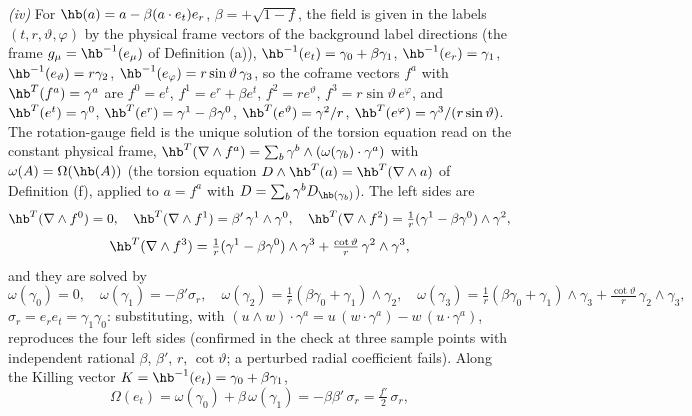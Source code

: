 \emph{(iv)} For $\hb(a) = a - \beta(a\cdot e_{t})e_{r}$, $\beta = +\sqrt{1 - f}$, the field is given in the labels $(t, r, \vartheta, \varphi)$ by the physical frame vectors of the background label directions (the frame $g_{\mu} = \hb^{-1}(e_{\mu})$ of Definition (a)), $\hb^{-1}(e_{t}) = \gamma_{0} + \beta\gamma_{1}$, $\hb^{-1}(e_{r}) = \gamma_{1}$, $\hb^{-1}(e_{\vartheta}) = r\gamma_{2}$, $\hb^{-1}(e_{\varphi}) = r\sin\vartheta\,\gamma_{3}$, so the coframe vectors $f^{a}$ with $\hb^{T}(f^{a}) = \gamma^{a}$ are $f^{0} = e^{t}$, $f^{1} = e^{r} + \beta e^{t}$, $f^{2} = r e^{\vartheta}$, $f^{3} = r\sin\vartheta\,e^{\varphi}$, and $\hb^{T}(e^{t}) = \gamma^{0}$, $\hb^{T}(e^{r}) = \gamma^{1} - \beta\gamma^{0}$, $\hb^{T}(e^{\vartheta}) = \gamma^{2}/r$, $\hb^{T}(e^{\varphi}) = \gamma^{3}/(r\sin\vartheta)$. The rotation-gauge field is the unique solution of the torsion equation read on the constant physical frame, $\hb^{T}(\nabla \wedge f^{a}) = \sum_{b}\gamma^{b} \wedge (\omega(\gamma_{b}) \cdot \gamma^{a})$ with $\omega(A) = \Omega(\hb(A))$ (the torsion equation $D \wedge \hb^{T}(a) = \hb^{T}(\nabla \wedge a)$ of Definition (f), applied to $a = f^{a}$ with $D = \sum_{b}\gamma^{b}D_{\hb(\gamma_{b})}$). The left sides are
\[
\hb^{T}(\nabla \wedge f^{0}) = 0, \quad \hb^{T}(\nabla \wedge f^{1}) = \beta'\,\gamma^{1} \wedge \gamma^{0}, \quad \hb^{T}(\nabla \wedge f^{2}) = \tfrac{1}{r}(\gamma^{1} - \beta\gamma^{0}) \wedge \gamma^{2},
\]
\[
\hb^{T}(\nabla \wedge f^{3}) = \tfrac{1}{r}(\gamma^{1} - \beta\gamma^{0}) \wedge \gamma^{3} + \tfrac{\cot\vartheta}{r}\,\gamma^{2} \wedge \gamma^{3},
\]
and they are solved by
\[
\omega(\gamma_{0}) = 0, \quad \omega(\gamma_{1}) = -\beta'\sigma_{r}, \quad \omega(\gamma_{2}) = \tfrac{1}{r}(\beta\gamma_{0} + \gamma_{1}) \wedge \gamma_{2}, \quad \omega(\gamma_{3}) = \tfrac{1}{r}(\beta\gamma_{0} + \gamma_{1}) \wedge \gamma_{3} + \tfrac{\cot\vartheta}{r}\,\gamma_{2} \wedge \gamma_{3},
\]
$\sigma_{r} = e_{r}e_{t} = \gamma_{1}\gamma_{0}$: substituting, with $(u \wedge w) \cdot \gamma^{a} = u\,(w \cdot \gamma^{a}) - w\,(u \cdot \gamma^{a})$, reproduces the four left sides (confirmed in the check at three sample points with independent rational $\beta$, $\beta'$, $r$, $\cot\vartheta$; a perturbed radial coefficient fails). Along the Killing vector $K = \hb^{-1}(e_{t}) = \gamma_{0} + \beta\gamma_{1}$,
\[
\Omega(e_{t}) = \omega(\gamma_{0}) + \beta\,\omega(\gamma_{1}) = -\beta\beta'\,\sigma_{r} = \tfrac{f'}{2}\,\sigma_{r},
\]
